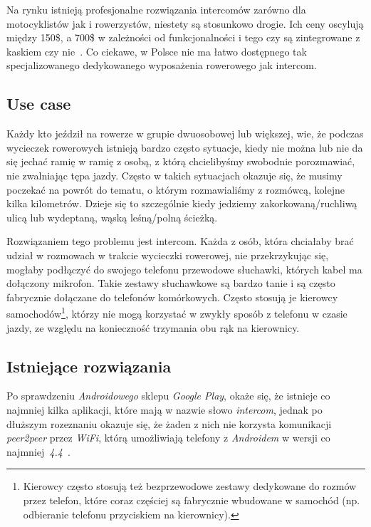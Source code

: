 \documentclass{article}
\begin{document}
Na rynku istnieją profesjonalne rozwiązania intercomów zarówno dla motocyklistów jak i rowerzystów, niestety są stosunkowo drogie. Ich ceny oscylują między 150\$, a 700\$ w zależności od funkcjonalności i tego czy są zintegrowane z kaskiem czy nie~\cite{www:bike-intercom}\cite{www:bike-intercom-mce}. Co ciekawe, w Polsce nie ma łatwo dostępnego tak specjalizowanego dedykowanego wyposażenia rowerowego jak intercom.


\subsection{Use case}

Każdy kto jeździł na rowerze w grupie dwuosobowej lub większej, wie, że podczas wycieczek rowerowych istnieją bardzo często sytuacje, kiedy nie można lub nie da się jechać ramię w ramię z osobą, z którą chcielibyśmy swobodnie porozmawiać, nie zwalniając tępa jazdy. Często w takich sytuacjach okazuje się, że musimy poczekać na powrót do tematu, o którym rozmawialiśmy z rozmówcą, kolejne kilka kilometrów. Dzieje się to szczególnie kiedy jedziemy zakorkowaną/ruchliwą ulicą lub wydeptaną, wąską leśną/polną ścieżką.

Rozwiązaniem tego problemu jest intercom. Każda z osób, która chciałaby brać udział w rozmowach w trakcie wycieczki rowerowej, nie przekrzykując się, mogłaby podłączyć do swojego telefonu przewodowe słuchawki, których kabel ma dołączony mikrofon. Takie zestawy słuchawkowe są bardzo tanie i są często fabrycznie dołączane do telefonów komórkowych. Często stosują je kierowcy samochodów\footnote{Kierowcy często stosują też bezprzewodowe zestawy dedykowane do rozmów przez telefon, które coraz częściej są fabrycznie wbudowane w samochód (np. odbieranie telefonu przyciskiem na kierownicy).}, którzy nie mogą korzystać w zwykły sposób z telefonu w czasie jazdy, ze względu na konieczność trzymania obu rąk na kierownicy.


\subsection{Istniejące rozwiązania}

Po sprawdzeniu \emph{Androidowego} sklepu \emph{Google Play}, okaże się, że istnieje co najmniej kilka aplikacji, które mają w nazwie słowo \emph{intercom}, jednak po dłuższym rozeznaniu okazuje się, że żaden z nich nie korzysta komunikacji \emph{peer2peer} przez \emph{WiFi}, którą umożliwiają telefony z \emph{Androidem} w wersji co najmniej~\emph{4.4}~\cite{www:android-wifi-p2p}\cite{www:android-wifi-p2p-tutorial}.
\end{document}
